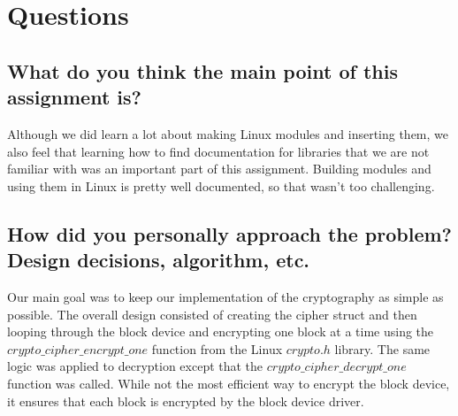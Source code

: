 \documentclass[letterpaper, onecolumn, draftclsnofoot, 10pt, compsoc]{IEEEtran}
\begin{document}
\section{Questions}
    
    \subsection{What do you think the main point of this assignment is?}
        \begin{singlespace}
         Although we did learn a lot about making Linux modules and inserting them, we also feel that learning how to find documentation for libraries that we are not familiar with was an important part of this assignment. Building modules and using them in Linux is pretty well documented, so that wasn't too challenging. 
        \end{singlespace}
    
    \subsection{How did you personally approach the problem? Design decisions, algorithm, etc.}
        \begin{singlespace}
           Our main goal was to keep our implementation of the cryptography as simple as possible. The overall design consisted of creating the cipher struct and then looping through the block device and encrypting one block at a time using the $crypto\_cipher\_encrypt\_one$ function from the Linux $crypto.h$ library. The same logic was applied to decryption except that the $crypto\_cipher\_decrypt\_one$ function was called. While not the most efficient way to encrypt the block device, it ensures that each block is encrypted by the block device driver.
        \end{singlespace}
    
\end{document}
